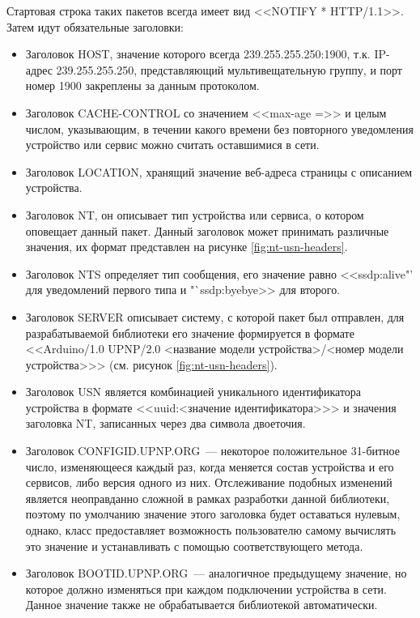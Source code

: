 Стартовая строка таких пакетов всегда имеет вид <<NOTIFY * HTTP/1.1>>.
Затем идут обязательные заголовки:
\begin{itemize}
	\item Заголовок HOST, значение которого всегда 239.255.255.250:1900, т.к.
	IP-адрес 239.255.255.250, представляющий мультивещательную группу, и порт номер 1900 закреплены за данным протоколом.
	\item Заголовок CACHE-CONTROL со значением <<max-age =>> и целым числом, указывающим, в течении какого времени без повторного уведомления устройство или сервис можно считать оставшимися в сети.
	\item Заголовок LOCATION, хранящий значение веб-адреса страницы с описанием устройства.
	\item Заголовок NT, он описывает тип устройства или сервиса, о котором оповещает данный пакет.
	Данный заголовок может принимать различные значения, их формат представлен на рисунке \ref{fig:nt-usn-headers}.
	\item Заголовок NTS определяет тип сообщения, его значение равно <<ssdp:alive"' для уведомлений первого типа и "`ssdp:byebye>> для второго.
	\item Заголовок SERVER описывает систему, с которой пакет был отправлен, для разрабатываемой библиотеки его значение формируется в формате <<Arduino/1.0 UPNP/2.0 <название модели устройства>/<номер модели устройства>>> (см. рисунок \ref{fig:nt-usn-headers}).
	\item Заголовок USN является комбинацией уникального идентификатора устройства в формате <<uuid:<значение идентификатора>>> и значения заголовка NT, записанных через два символа двоеточия.
	\item Заголовок CONFIGID.UPNP.ORG~--- некоторое положительное 31-битное число, изменяющееся каждый раз, когда меняется состав устройства и его сервисов, либо версия одного из них.
	Отслеживание подобных изменений является неоправданно сложной в рамках разработки данной библиотеки, поэтому по умолчанию значение этого заголовка будет оставаться нулевым, однако, класс предоставляет возможность пользователю самому вычислять это значение и устанавливать с помощью соответствующего метода.
	\item Заголовок BOOTID.UPNP.ORG~--- аналогичное предыдущему значение, но которое должно изменяться при каждом подключении устройства в сети.
	Данное значение также не обрабатывается библиотекой автоматически.
\end{itemize}


